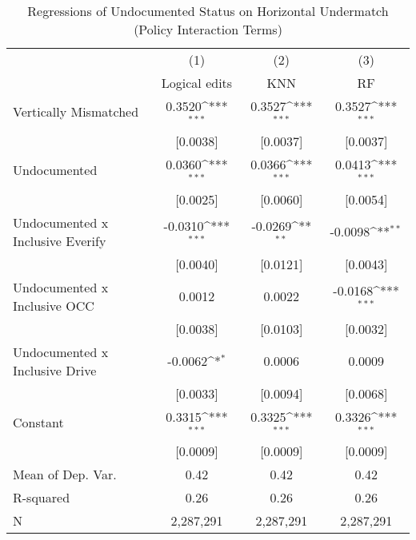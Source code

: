 \begin{table}[htbp]\centering
\def\sym#1{\ifmmode^{#1}\else\(^{#1}\)\fi}
\caption{Regressions of Undocumented Status on Horizontal Undermatch (Policy Interaction Terms)}
\begin{tabular}{l*{3}{c}}
\toprule
                    &\multicolumn{1}{c}{(1)}         &\multicolumn{1}{c}{(2)}         &\multicolumn{1}{c}{(3)}         \\
                    &Logical edits         &         KNN         &          RF         \\
\midrule
Vertically Mismatched&      0.3520\sym{***}&      0.3527\sym{***}&      0.3527\sym{***}\\
                    &    [0.0038]         &    [0.0037]         &    [0.0037]         \\
\addlinespace
Undocumented        &      0.0360\sym{***}&      0.0366\sym{***}&      0.0413\sym{***}\\
                    &    [0.0025]         &    [0.0060]         &    [0.0054]         \\
\addlinespace
Undocumented x Inclusive Everify&     -0.0310\sym{***}&     -0.0269\sym{**} &     -0.0098\sym{**} \\
                    &    [0.0040]         &    [0.0121]         &    [0.0043]         \\
\addlinespace
Undocumented x Inclusive OCC&      0.0012         &      0.0022         &     -0.0168\sym{***}\\
                    &    [0.0038]         &    [0.0103]         &    [0.0032]         \\
\addlinespace
Undocumented x Inclusive Drive&     -0.0062\sym{*}  &      0.0006         &      0.0009         \\
                    &    [0.0033]         &    [0.0094]         &    [0.0068]         \\
\addlinespace
Constant            &      0.3315\sym{***}&      0.3325\sym{***}&      0.3326\sym{***}\\
                    &    [0.0009]         &    [0.0009]         &    [0.0009]         \\
\midrule
Mean of Dep. Var.   &        0.42         &        0.42         &        0.42         \\
R-squared           &        0.26         &        0.26         &        0.26         \\
N                   &   2,287,291         &   2,287,291         &   2,287,291         \\

\end{tabular}
\end{table}
